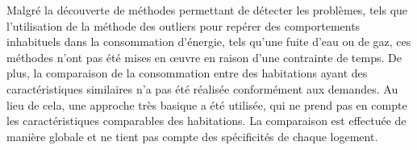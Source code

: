 \documentclass[../rapport.tex]{subfiles}
\begin{document}
Malgré la découverte de méthodes permettant de détecter les problèmes, tels que l'utilisation de la méthode des outliers pour repérer des comportements inhabituels dans la consommation d'énergie, tels qu'une fuite d'eau ou de gaz, ces méthodes n'ont pas été mises en œuvre en raison d'une contrainte de temps. 
De plus, la comparaison de la consommation entre des habitations ayant des caractéristiques similaires n'a pas été réalisée conformément aux demandes. Au lieu de cela, une approche très basique a été utilisée, qui ne prend pas en compte les caractéristiques comparables des habitations. La comparaison est effectuée de manière globale et ne tient pas compte des spécificités de chaque logement.
\end{document}
